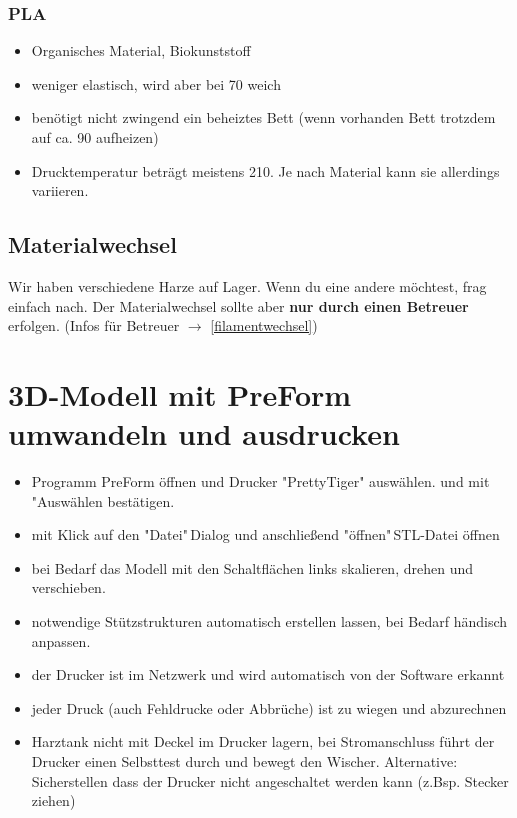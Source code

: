 \documentclass{\basedir/fablab-document}
\begin{document}
	\subsubsection{PLA}
	\begin{itemize}
		\item Organisches Material, Biokunststoff
		\item weniger elastisch, wird aber bei 70\textcelsius{} weich
		\item benötigt nicht zwingend ein beheiztes Bett (wenn vorhanden Bett trotzdem auf ca. 90\textcelsius{} aufheizen)
		\item Drucktemperatur beträgt meistens 210\textcelsius{}. Je nach Material kann sie allerdings variieren.
	\end{itemize}

	\subsection{Materialwechsel}
	Wir haben verschiedene Harze auf Lager. Wenn du eine andere möchtest, frag einfach nach.
	Der Materialwechsel sollte aber \textbf{nur durch einen Betreuer} erfolgen. (Infos für Betreuer $\to$ \ref{filamentwechsel})
	
	
	\section{3D-Modell mit PreForm umwandeln und ausdrucken}

	\begin{itemize}
		\item Programm PreForm öffnen und Drucker "PrettyTiger" auswählen. und mit "Auswählen bestätigen.
		\item mit Klick auf den "Datei"\,Dialog und anschließend "öffnen"\,STL-Datei öffnen
		\item bei Bedarf das Modell mit den Schaltflächen links skalieren, drehen und verschieben.
		\item notwendige Stützstrukturen automatisch erstellen lassen, bei Bedarf händisch anpassen.
		\item der Drucker ist im Netzwerk und wird automatisch von der Software erkannt
		\item jeder Druck (auch Fehldrucke oder Abbrüche) ist zu wiegen und abzurechnen
		\item Harztank nicht mit Deckel im Drucker lagern, bei Stromanschluss führt der Drucker einen Selbsttest durch und bewegt den Wischer. Alternative: Sicherstellen dass der Drucker nicht angeschaltet werden kann (z.Bsp. Stecker ziehen)
		\end{itemize}
	
\end{document}
